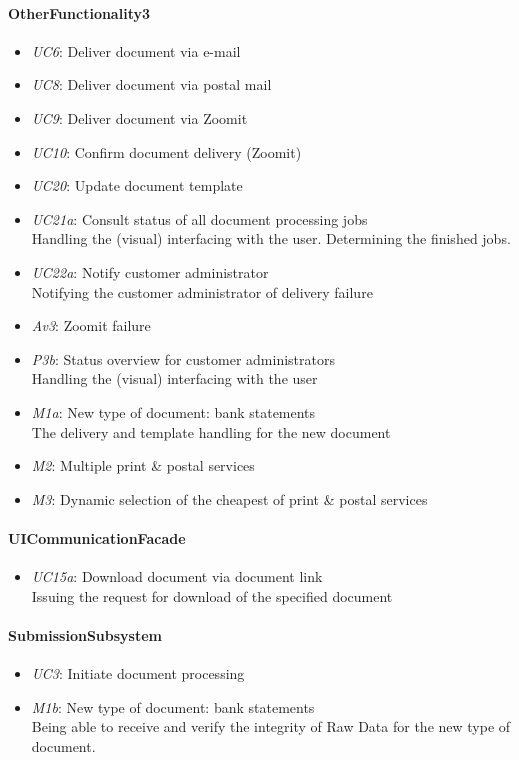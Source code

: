 \documentclass[a4paper,10pt]{article}
\begin{document}
\paragraph{OtherFunctionality3}
\begin{itemize}
    \item \emph{UC6}: Deliver document via e-mail
    \item \emph{UC8}: Deliver document via postal mail
    \item \emph{UC9}: Deliver document via Zoomit
    \item \emph{UC10}: Confirm document delivery (Zoomit)
    \item \emph{UC20}: Update document template
    \item \emph{UC21a}: Consult status of all document processing jobs\\
    Handling the (visual) interfacing with the user. Determining the finished jobs.
    \item \emph{UC22a}: Notify customer administrator\\
    Notifying the customer administrator of delivery failure
    \item \emph{Av3}: Zoomit failure
    \item \emph{P3b}: Status overview for customer administrators\\
    Handling the (visual) interfacing with the user
    \item \emph{M1a}: New type of document: bank statements\\
    The delivery and template handling for the new document
    \item \emph{M2}: Multiple print \& postal services
    \item \emph{M3}: Dynamic selection of the cheapest of print \& postal services
\end{itemize}


\paragraph{UICommunicationFacade}
\begin{itemize}
    \item \emph{UC15a}: Download document via document link\\
    Issuing the request for download of the specified document
\end{itemize}

\paragraph{SubmissionSubsystem}
\begin{itemize}
	\item \emph{UC3}: Initiate document processing
	\item \emph{M1b}: New type of document: bank statements\\
	Being able to receive and verify the integrity of Raw Data for the new type of document.
\end{itemize}
\end{document}
